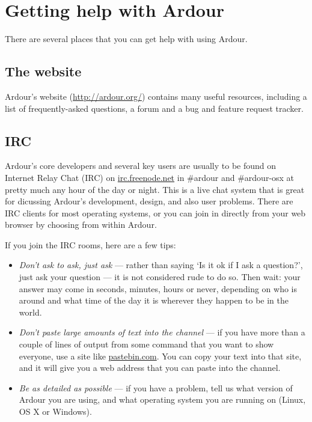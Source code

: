 \documentclass[10pt,a4paper]{book}
\newcommand{\menu}[1]{\emph{\StrSubstitute{#1}{,}{ $\rightarrow$ }}}
\begin{document}
\section{Getting help with Ardour}

There are several places that you can get help with using Ardour.

\subsection{The website}

Ardour's website (\url{http://ardour.org/}) contains many useful
resources, including a list of frequently-asked questions, a forum and
a bug and feature request tracker.

\subsection{IRC}

Ardour's core developers and several key users are usually to be found
on Internet Relay Chat (IRC) on \url{irc.freenode.net} in \#ardour and
\#ardour-osx at pretty much any hour of the day or night.  This is a
live chat system that is great for dicussing Ardour's development,
design, and also user problems.  There are IRC clients for most
operating systems, or you can join in directly from your web browser
by choosing \menu{Help,Chat} from within Ardour.

If you join the IRC rooms, here are a few tips:

\begin{itemize}
\item \emph{Don't ask to ask, just ask} --- rather than saying `Is it
  ok if I ask a question?', just ask your question --- it is not
  considered rude to do so.  Then wait: your answer may come in
  seconds, minutes, hours or never, depending on who is around and
  what time of the day it is wherever they happen to be in the world.
\item \emph{Don't paste large amounts of text into the channel} --- if
  you have more than a couple of lines of output from some command
  that you want to show everyone, use a site like \url{pastebin.com}.
  You can copy your text into that site, and it will give you a web
  address that you can paste into the channel.
\item \emph{Be as detailed as possible} --- if you have a problem,
  tell us what version of Ardour you are using, and what operating
  system you are running on (Linux, OS X or Windows).
\end{itemize}
\end{document}
